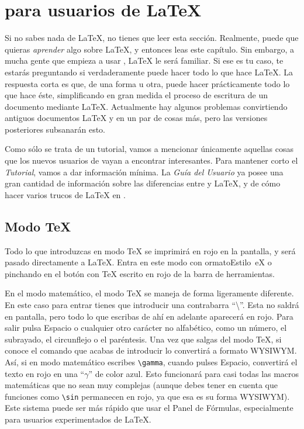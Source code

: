 \section{\LyX{} para usuarios de \LaTeX{}}

\label{sec:latexusers}Si no sabes nada de \LaTeX{}, no tienes que
leer esta sección. Realmente, puede que quieras \emph{aprender} algo
sobre \LaTeX{}, y entonces leas este capítulo. Sin embargo, a mucha
gente que empieza a usar \LyX{}, \LaTeX{} le será familiar. Si ese
es tu caso, te estarás preguntando si verdaderamente \LyX{} puede
hacer todo lo que hace \LaTeX{}. La respuesta corta es que, de una
forma u otra, puede hacer prácticamente todo lo que hace éste, simplificando
en gran medida el proceso de escritura de un documento mediante \LaTeX{}.
Actualmente hay algunos problemas convirtiendo antiguos documentos
\LaTeX{} y en un par de cosas más, pero las versiones posteriores
subsanarán esto.

Como sólo se trata de un tutorial, vamos a mencionar únicamente aquellas
cosas que los nuevos usuarios de \LyX{} vayan a encontrar interesantes.
Para mantener corto el \emph{Tutorial}, vamos a dar información mínima.
La \emph{Guía del Usuario} ya posee una gran cantidad de información
sobre las diferencias entre \LyX{} y \LaTeX{}, y de cómo hacer varios
trucos de \LaTeX{} en \LyX{}.


\subsection{Modo \TeX{}}

Todo lo que introduzcas en modo \TeX{} se imprimirá en rojo en la
pantalla, y será pasado directamente a \LaTeX{}. Entra en este modo
con \textsf{}\textsf{ormato\lyxarrow{}Estilo~}\textsf{}\textsf{eX}
o pinchando en el botón con \TeX{} escrito en rojo de la barra de
herramientas.

En el modo matemático, el modo \TeX{} se maneja de forma ligeramente
diferente. En este caso para entrar tienes que introducir una contrabarra
{}``\textbackslash{}''. Esta no saldrá en pantalla, pero todo lo
que escribas de ahí en adelante aparecerá en rojo. Para salir pulsa
\textsf{Espacio} o cualquier otro carácter no alfabético, como un
número, el subrayado, el circunflejo o el paréntesis. Una vez que
salgas del modo \TeX{}, si \LyX{} conoce el comando que acabas de
introducir lo convertirá a formato WYSIWYM. Así, si en modo matemático
escribes \texttt{\textbackslash{}gamma}, cuando pulses \textsf{Espacio},
\LyX{} convertirá el texto en rojo en una {}``$\gamma$'' de color
azul. Esto funcionará para casi todas las macros matemáticas que no
sean muy complejas (aunque debes tener en cuenta que funciones como
\texttt{\textbackslash{}sin} permanecen en rojo, ya que esa es su
forma WYSIWYM). Este sistema puede ser más rápido que usar el \textsf{Panel
de Fórmulas}, especialmente para usuarios experimentados de \LaTeX{}.

